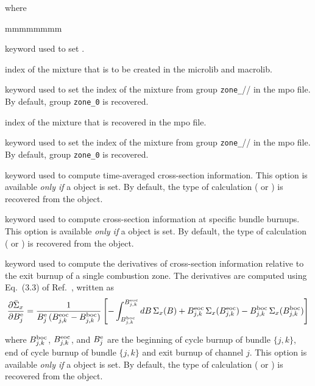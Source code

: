 \noindent where
\begin{ListeDeDescription}{mmmmmmmm}

\item[\moc{MIX}] keyword used to set .

\item[\dusa{imix}] index of the mixture that is to be created in the {\sc microlib} and {\sc macrolib}.

\item[\moc{FROM}] keyword used to set the index of the mixture from group {\tt zone\_}// in the {\sc mpo} file. By default, group {\tt zone\_0} is recovered.

\item[\dusa{imixold}] index of the mixture that is recovered in the {\sc mpo} file.

\item[\moc{USE}] keyword used to set the index of the mixture from group {\tt zone\_}// in the {\sc mpo} file. By default, group {\tt zone\_0} is recovered.

\item[\moc{TIMAV-BURN}] keyword used to compute time-averaged cross-section information. This option is available {\sl only if} a  object is set.
By default, the type of calculation ( or ) is recovered from the  object.

\item[\moc{INST-BURN}] keyword used to compute cross-section information at specific bundle burnups. This option is available {\sl only if} a  object is set.
By default, the type of calculation ( or ) is recovered from the  object.

\item[\moc{AVG-EX-BURN}] keyword used to compute the derivatives of cross-section information relative to the exit burnup of a single combustion zone. The derivatives are computed using Eq.~(3.3) of Ref.~, written as
$$
{\partial \bar\Sigma_x\over \partial B_j^{\rm e}}={1\over B_j^{\rm e}\, (B_{j,k}^{\rm eoc}-B_{j,k}^{\rm boc})}
\left[- \int_{B_{j,k}^{\rm boc}}^{B_{j,k}^{\rm eoc}}dB \, \Sigma_x(B)+B_{j,k}^{\rm eoc}\, \Sigma_x(B_{j,k}^{\rm eoc})-B_{j,k}^{\rm boc}\, \Sigma_x(B_{j,k}^{\rm boc})\right]
$$

\noindent where $B_{j,k}^{\rm boc}$, $B_{j,k}^{\rm eoc}$, and $B_j^{\rm e}$ are the beginning of cycle burnup of bundle $\{j,k\}$, end of cycle burnup of bundle $\{j,k\}$ and exit burnup of channel $j$. This option is available {\sl only if} a  object is set.
By default, the type of calculation ( or ) is recovered from the  object.


\end{ListeDeDescription}
